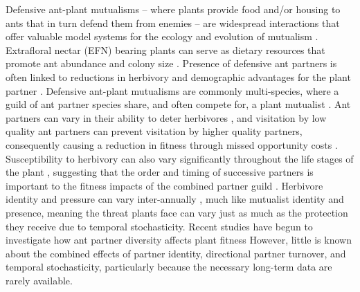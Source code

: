 \documentclass[11pt]{article}
\begin{document}
	Defensive ant-plant mutualisms -- where plants provide food and/or housing to ants that in turn defend them from enemies -- are widespread interactions that offer valuable model systems for the ecology and evolution of mutualism \citep{Bronstein1998, Bronstein2006}. 
	Extrafloral nectar (EFN) bearing plants can serve as dietary resources that promote ant abundance and colony size \citep{Byk2011, Ness2009, Ness2006, Donald2022}.
	Presence of defensive ant partners is often linked to reductions in herbivory  \citep{Trager2010, Rudgers2004} and demographic advantages for the plant partner \citep{Baez2016}.
	Defensive ant-plant mutualisms are commonly multi-species, where a guild of ant partner species share, and often compete for, a plant mutualist \citep{Bronstein1998, Beattie1985, Trager2010, Agrawal1998}.
	Ant partners can vary in their ability to deter herbivores \citep{Bruna2014}, and visitation by low quality ant partners can prevent visitation by higher quality partners, consequently causing a reduction in fitness through missed opportunity costs \citep{Fraser2001, Frederickson2005}.
	Susceptibility to herbivory can also vary significantly throughout the life stages of the plant \citep{Boege2005}, suggesting that the order and timing of successive partners is important to the fitness impacts of the combined partner guild \citep{Barton2010, Boege2005, Fonseca2003}.
	Herbivore identity and pressure can vary inter-annually \cite{Wetzel2023}, much like mutualist identity and presence, meaning the threat plants face can vary just as much as the protection they receive due to temporal stochasticity. 
	Recent studies have begun to investigate how ant partner diversity affects plant fitness \citep{Palmer2010,Afkhami2014,Fiala1994,Gaume1998,Dattilo2014,Ludka2015}
	However, little is known about the combined effects of partner identity, directional partner turnover, and temporal stochasticity, particularly because the necessary long-term data are rarely available. 
	
\end{document}
